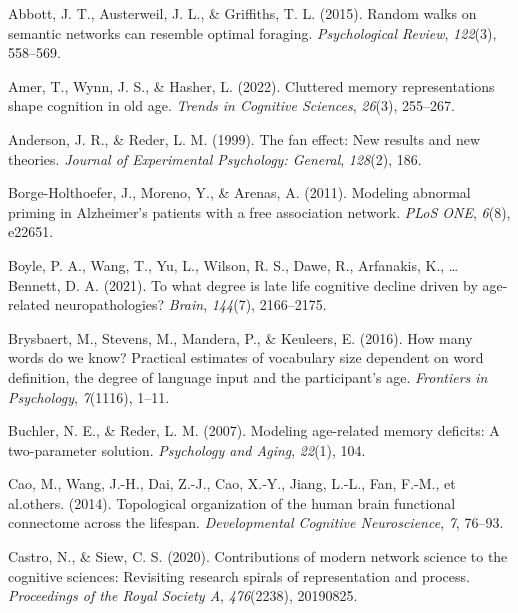 \documentclass[
  man,floatsintext]{apa6}
\newlength{\cslhangindent}
\newlength{\cslentryspacingunit} %
\newenvironment{CSLReferences}[2] %
 {%
  \setlength{\parindent}{0pt}
  \ifodd #1
  \let\oldpar\par
  \def\par{\hangindent=\cslhangindent\oldpar}
  \fi
  \setlength{\parskip}{#2\cslentryspacingunit}
 }%
 {}
\begin{document}
\hypertarget{refs}{}
\begin{CSLReferences}{1}{0}
\leavevmode{}%
Abbott, J. T., Austerweil, J. L., \& Griffiths, T. L. (2015). Random walks on semantic networks can resemble optimal foraging. \emph{Psychological Review}, \emph{122}(3), 558--569.

\leavevmode{}%
Amer, T., Wynn, J. S., \& Hasher, L. (2022). Cluttered memory representations shape cognition in old age. \emph{Trends in Cognitive Sciences}, \emph{26}(3), 255--267.

\leavevmode{}%
Anderson, J. R., \& Reder, L. M. (1999). The fan effect: New results and new theories. \emph{Journal of Experimental Psychology: General}, \emph{128}(2), 186.

\leavevmode{}%
Borge-Holthoefer, J., Moreno, Y., \& Arenas, A. (2011). {Modeling abnormal priming in Alzheimer's patients with a free association network}. \emph{PLoS ONE}, \emph{6}(8), e22651.

\leavevmode{}%
Boyle, P. A., Wang, T., Yu, L., Wilson, R. S., Dawe, R., Arfanakis, K., \ldots{} Bennett, D. A. (2021). To what degree is late life cognitive decline driven by age-related neuropathologies? \emph{Brain}, \emph{144}(7), 2166--2175.

\leavevmode{}%
Brysbaert, M., Stevens, M., Mandera, P., \& Keuleers, E. (2016). How many words do we know? Practical estimates of vocabulary size dependent on word definition, the degree of language input and the participant's age. \emph{Frontiers in Psychology}, \emph{7}(1116), 1--11.

\leavevmode{}%
Buchler, N. E., \& Reder, L. M. (2007). Modeling age-related memory deficits: A two-parameter solution. \emph{Psychology and Aging}, \emph{22}(1), 104.

\leavevmode{}%
Cao, M., Wang, J.-H., Dai, Z.-J., Cao, X.-Y., Jiang, L.-L., Fan, F.-M., et al.others. (2014). Topological organization of the human brain functional connectome across the lifespan. \emph{Developmental Cognitive Neuroscience}, \emph{7}, 76--93.

\leavevmode{}%
Castro, N., \& Siew, C. S. (2020). Contributions of modern network science to the cognitive sciences: Revisiting research spirals of representation and process. \emph{Proceedings of the Royal Society A}, \emph{476}(2238), 20190825.


\end{CSLReferences}
\end{document}
